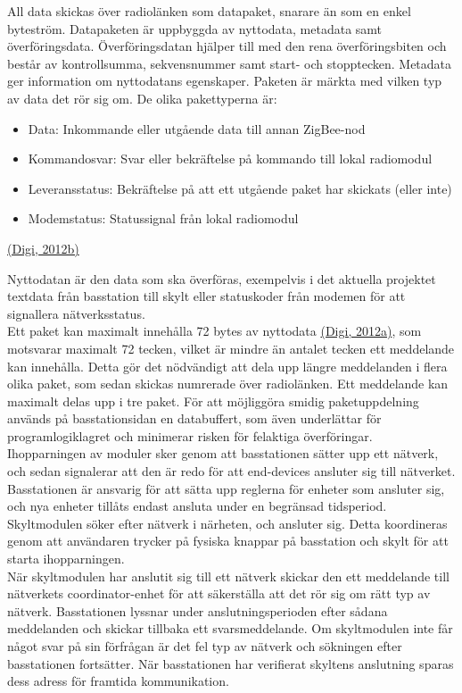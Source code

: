 \documentclass[a4paper,11pt]{article}
\begin{document}
All data skickas över radiolänken som datapaket, snarare än som en enkel byteström. Datapaketen är uppbyggda av nyttodata, metadata samt överföringsdata. Överföringsdatan hjälper till med den rena överföringsbiten och består av kontrollsumma, sekvensnummer samt start- och stopptecken. Metadata ger information om nyttodatans egenskaper.
Paketen är märkta med vilken typ av data det rör sig om. De olika pakettyperna är:

	\begin{itemize}
    	\item Data: Inkommande eller utgående data till annan ZigBee-nod
    	\item Kommandosvar: Svar eller bekräftelse på kommando till lokal radiomodul
    	\item Leveransstatus: Bekräftelse på att ett utgående paket har skickats (eller inte)
    	\item Modemstatus: Statussignal från lokal radiomodul
    	\end{itemize}
\hyperref[digi]{(Digi, 2012b)}

Nyttodatan är den data som ska överföras, exempelvis i det aktuella projektet textdata från basstation till skylt eller statuskoder från modemen för att signallera nätverksstatus. \\

Ett paket kan maximalt innehålla 72 bytes av nyttodata \hyperref[digi]{(Digi, 2012a)}, som motsvarar maximalt 72 tecken, vilket är mindre än antalet tecken ett meddelande kan innehålla. Detta gör det nödvändigt att dela upp längre meddelanden i flera olika paket, som sedan skickas numrerade över radiolänken. Ett meddelande kan maximalt delas upp i tre paket. För att möjliggöra smidig paketuppdelning används på basstationsidan en databuffert, som även underlättar för programlogiklagret och minimerar risken för felaktiga överföringar. \\

Ihopparningen av moduler sker genom att basstationen sätter upp ett nätverk, och sedan signalerar att den är redo för att end-devices ansluter sig till nätverket. Basstationen är ansvarig för att sätta upp reglerna för enheter som ansluter sig, och nya enheter tillåts endast ansluta under en begränsad tidsperiod. Skyltmodulen söker efter nätverk i närheten, och ansluter sig. Detta koordineras genom att användaren trycker på fysiska knappar på basstation och skylt för att starta ihopparningen. \\

När skyltmodulen har anslutit sig till ett nätverk skickar den ett meddelande till nätverkets coordinator-enhet för att säkerställa att det rör sig om rätt typ av nätverk. Basstationen lyssnar under anslutningsperioden efter sådana meddelanden och skickar tillbaka ett svarsmeddelande. Om skyltmodulen inte får något svar på sin förfrågan är det fel typ av nätverk och sökningen efter basstationen fortsätter. När basstationen har verifierat skyltens anslutning sparas dess adress för framtida kommunikation. \\
\end{document}
